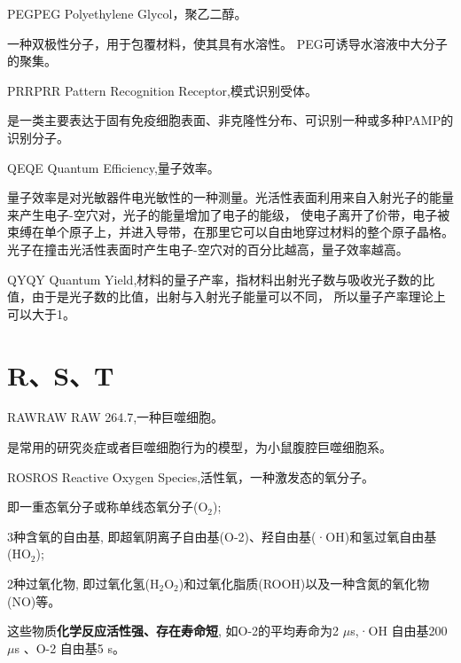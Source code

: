 \documentclass[cn,11pt,chinese]{elegantbook}
\begin{document}
\begin{theorem}{PEG}{PEG} 
  Polyethylene Glycol，聚乙二醇。

  一种双极性分子，用于包覆材料，使其具有水溶性。
  PEG可诱导水溶液中大分子的聚集。
\end{theorem}

\begin{theorem}{PRR}{PRR}
  Pattern Recognition Receptor,模式识别受体。

  是一类主要表达于固有免疫细胞表面、非克隆性分布、可识别一种或多种PAMP的识别分子。
\end{theorem}

\begin{theorem}{QE}{QE} 
Quantum Efficiency,量子效率。

量子效率是对光敏器件电光敏性的一种测量。光活性表面利用来自入射光子的能量来产生电子-空穴对，光子的能量增加了电子的能级，
使电子离开了价带，电子被束缚在单个原子上，并进入导带，在那里它可以自由地穿过材料的整个原子晶格。
光子在撞击光活性表面时产生电子-空穴对的百分比越高，量子效率越高。
\end{theorem}

\begin{theorem}{QY}{QY} 
  Quantum Yield,材料的量子产率，指材料出射光子数与吸收光子数的比值，由于是光子数的比值，出射与入射光子能量可以不同，
  所以量子产率理论上可以大于1。
\end{theorem}
\section{R、S、T}
\begin{theorem}{RAW}{RAW} 
  RAW 264.7,一种巨噬细胞。
  
  是常用的研究炎症或者巨噬细胞行为的模型，为小鼠腹腔巨噬细胞系。
\end{theorem} 

\begin{theorem}{ROS}{ROS} 
  Reactive Oxygen Species,活性氧，一种激发态的氧分子。
  
  即一重态氧分子或称单线态氧分子(O$_2$);

  3种含氧的自由基, 
  即超氧阴离子自由基(O-2)、羟自由基(·OH)和氢过氧自由基(HO$_2$);

  2种过氧化物, 
  即过氧化氢(H$_2$O$_2$)和过氧化脂质(ROOH)以及一种含氮的氧化物(NO)等。
  
  这些物质\textbf{化学反应活性强、存在寿命短},
  如O-2的平均寿命为2 $\mu$s,·OH 自由基200 $\mu$s 、O-2 自由基5 s。
\end{theorem} 
\end{document}
